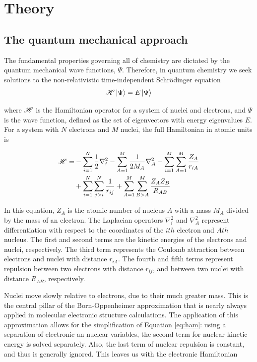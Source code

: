 
\chapter{Theory}
\label{ch:theory}

\section{The quantum mechanical approach}

The fundamental properties governing all of chemistry are dictated by the quantum mechanical wave functions, $\Psi$. Therefore, in quantum chemistry we seek solutions to the non-relativistic time-independent Schr{\"o}dinger equation
\begin{equation}
\mathscr{H} \ket{\Psi} = E \ket{\Psi}
\label{eq:schrodinger}
\end{equation}

\noindent where $\mathscr{H}$ is the Hamiltonian operator for a system of nuclei and electrons, and $\Psi$ is the wave function, defined as the set of eigenvectors with energy eigenvalues $E$.\cite{Griffiths2016} For a system with $N$ electrons and $M$ nuclei, the full Hamiltonian in atomic units is

\begin{equation}
\begin{split}
\mathscr{H} = &-\sum_{i=1}^N \frac{1}{2}\nabla_i^2 - \sum_{A=1}^M\frac{1}{2M_A}\nabla_A^2
-\sum_{i=1}^M\sum_{A=1}^M\frac{Z_A}{r_{iA}} \\
&+ \sum_{i=1}^N\sum_{j>i}^N \frac{1}{r_{ij}} + \sum_{A=1}^M\sum_{B>A}^M
\frac{Z_AZ_B}{R_{AB}}
\label{eq:ham}
\end{split}
\end{equation}

\noindent In this equation, $Z_A$ is the atomic number of nucleus $A$ with a mass $M_A$ divided by the mass of an electron. The Laplacian operators $\nabla_i^2$ and $\nabla_A^2$ represent differentiation with respect to the coordinates of the $ith$ electron and $Ath$ nucleus. The first and second terms are the kinetic energies of the electrons and nuclei, respectively. The third term represents the Coulomb attraction between electrons and nuclei with distance $r_{iA}$. The fourth and fifth terms represent repulsion between two electrons with distance $r_{ij}$, and between two nuclei with distance $R_{AB}$, respectively.

Nuclei move slowly relative to electrons, due to their much greater mass. This is the central pillar of the Born-Oppenheimer approximation that is nearly always applied in molecular electronic structure calculations. The application of this approximation allows for the simplification of Equation \ref{eq:ham}: using a separation of electronic an nuclear variables, the second term for nuclear kinetic energy is solved separately. Also, the last term of nuclear repulsion is constant, and thus is generally ignored. This leaves us with the electronic Hamiltonian

